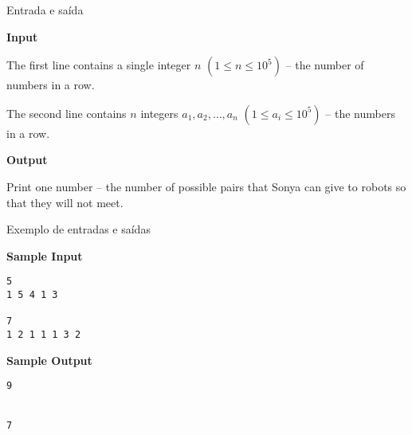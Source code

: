\begin{frame}[fragile]{Entrada e saída}

\textbf{Input}

The first line contains a single integer $n$ $(1\leq n\leq 10^5)$ -- the number of numbers in a row.

The second line contains $n$ integers $a_1, a_2, \ldots, a_n$ $(1\leq a_i\leq 10^5)$ -- the numbers in a row.

\textbf{Output}

Print one number -- the number of possible pairs that Sonya can give to robots so that they will not meet.

\end{frame}

\begin{frame}[fragile]{Exemplo de entradas e saídas}

\begin{minipage}[t]{0.5\textwidth}
\textbf{Sample Input}
\begin{verbatim}
5
1 5 4 1 3

7
1 2 1 1 1 3 2
\end{verbatim}
\end{minipage}
\begin{minipage}[t]{0.45\textwidth}
\textbf{Sample Output}
\begin{verbatim}
9


7
\end{verbatim}
\end{minipage}
\end{frame}

